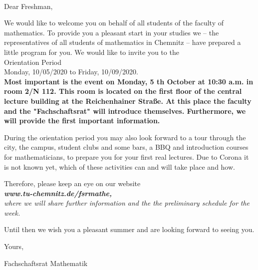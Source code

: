 \documentclass[nkz,einrichtung,usemycontact]{tucletter2019}
\begin{document}
	
\begin{letter}{%
\, \\
}

\opening{Dear Freshman,}

We would like to welcome you on behalf of all students of the faculty of mathematics. To provide you a pleasant start in your studies we – the representatives of all students of mathematics in Chemnitz – have prepared a little program for you. We would like to invite you to the\\[12pt]

\hspace*{\fill} \Large Orientation Period \hspace*{\fill} \\
\hspace*{\fill} Monday, 10/05/2020 to Friday, 10/09/2020. \normalsize \hspace*{\fill} \\[16pt]

\bfseries Most important is the event on Monday, 5 th October at 10:30 a.m. in room
2/N 112. This room is located on the first floor of the central lecture building
at the Reichenhainer Straße. At this place the faculty and the "Fachschaftsrat"
will introduce themselves. Furthermore, we will provide the first important
information.\mdseries

\medskip

During the orientation period you may also look forward to a tour through the city, the
campus, student clubs and some bars, a BBQ and introduction courses for mathematicians, to prepare you for your first real lectures. Due to Corona it is not known yet, which of these activities can and will take place and how.

\medskip

Therefore, please keep an eye on our website\\[8pt]
\hspace*{\fill} \itshape\textbf{www.tu-chemnitz.de/fsrmathe,} \upshape \hspace*{\fill} \\[8pt]
where we will share further information and the the preliminary schedule for the week.

\medskip

Until then we wish you a pleasant summer and are looking forward to seeing you.

\medskip

Yours,

Fachschaftsrat Mathematik

\end{letter}
\end{document}

